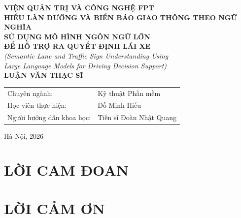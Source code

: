 \documentclass[a4paper,12pt]{report}
\begin{document}
\begin{titlepage}
\centering
\Large \textbf{VIỆN QUẢN TRỊ VÀ CÔNG NGHỆ FPT}\\[2cm]

\Large \textbf{HIỂU LÀN ĐƯỜNG VÀ BIỂN BÁO GIAO THÔNG THEO NGỮ NGHĨA\\
SỬ DỤNG MÔ HÌNH NGÔN NGỮ LỚN\\
ĐỂ HỖ TRỢ RA QUYẾT ĐỊNH LÁI XE}\\[0.5cm]

\normalsize \textit{(Semantic Lane and Traffic Sign Understanding Using\\
Large Language Models for Driving Decision Support)}\\[2.5cm]

\Large \textbf{LUẬN VĂN THẠC SĨ}\\[2cm]

\normalsize
\begin{tabular}{ll}
Chuyên ngành: & Kỹ thuật Phần mềm \\[0.3cm]
Học viên thực hiện: & Đỗ Minh Hiếu \\[0.3cm]
Người hướng dẫn khoa học: & Tiến sĩ Đoàn Nhật Quang \\
\end{tabular}

\vfill
Hà Nội, 2026
\end{titlepage}


\chapter*{LỜI CAM ĐOAN}

\chapter*{LỜI CẢM ƠN}

\tableofcontents

\listoftables
{}
\end{document}
